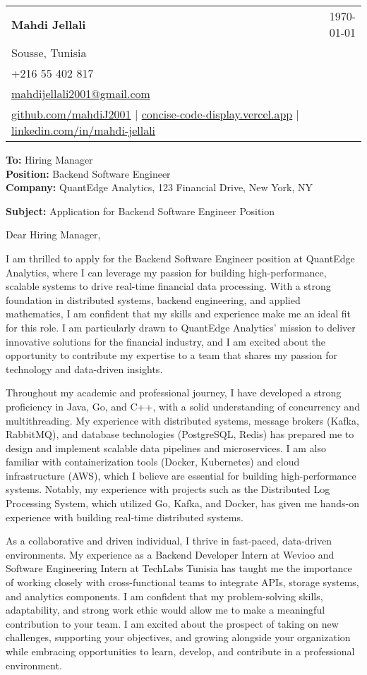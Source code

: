 \documentclass[letterpaper,11pt]{article}
\makeatletter
\newcommand{\letterHeading}[5]{
    \begin{tabular*}{\textwidth}{l@{\extracolsep{\fill}}r}
    \textbf{\Large #1} & #5 \\  %
    #2 & \\
    #3 & \\
    #4 & \\
    \end{tabular*}
    \vspace{15pt}
}
\newcommand{\letterRecipient}[3]{
    \textbf{\large To:} #1 \\
    \textbf{\large Position:} #2 \\
    \textbf{\large Company:} #3 \\
    \vspace{12pt}
}
\newcommand{\letterSubject}[1]{
    \textbf{\large Subject:} #1 \\
    \vspace{15pt}
}
\makeatother
\begin{document}
    \letterHeading
    {Mahdi Jellali}
    {Sousse, Tunisia}
    {+216 55 402 817 \\ \href{mailto:mahdijellali2001@gmail.com}{mahdijellali2001@gmail.com}}
    {\href{https://github.com/mahdiJ2001}{github.com/mahdiJ2001} $|$ \href{https://concise-code-display.vercel.app/}{concise-code-display.vercel.app} $|$ \href{https://www.linkedin.com/in/mahdi-jellali/}{linkedin.com/in/mahdi-jellali}}
    {\today}

    \letterRecipient
    {Hiring Manager}
    {Backend Software Engineer}
    {QuantEdge Analytics, 123 Financial Drive, New York, NY}

    \letterSubject{Application for Backend Software Engineer Position}

    Dear Hiring Manager,

    I am thrilled to apply for the Backend Software Engineer position at QuantEdge Analytics, where I can leverage my passion for building high-performance, scalable systems to drive real-time financial data processing. With a strong foundation in distributed systems, backend engineering, and applied mathematics, I am confident that my skills and experience make me an ideal fit for this role. I am particularly drawn to QuantEdge Analytics' mission to deliver innovative solutions for the financial industry, and I am excited about the opportunity to contribute my expertise to a team that shares my passion for technology and data-driven insights.

    Throughout my academic and professional journey, I have developed a strong proficiency in Java, Go, and C++, with a solid understanding of concurrency and multithreading. My experience with distributed systems, message brokers (Kafka, RabbitMQ), and database technologies (PostgreSQL, Redis) has prepared me to design and implement scalable data pipelines and microservices. I am also familiar with containerization tools (Docker, Kubernetes) and cloud infrastructure (AWS), which I believe are essential for building high-performance systems. Notably, my experience with projects such as the Distributed Log Processing System, which utilized Go, Kafka, and Docker, has given me hands-on experience with building real-time distributed systems.

    As a collaborative and driven individual, I thrive in fast-paced, data-driven environments. My experience as a Backend Developer Intern at Wevioo and Software Engineering Intern at TechLabs Tunisia has taught me the importance of working closely with cross-functional teams to integrate APIs, storage systems, and analytics components. I am confident that my problem-solving skills, adaptability, and strong work ethic would allow me to make a meaningful contribution to your team. I am excited about the prospect of taking on new challenges, supporting your objectives, and growing alongside your organization while embracing opportunities to learn, develop, and contribute in a professional environment.
\end{document}
